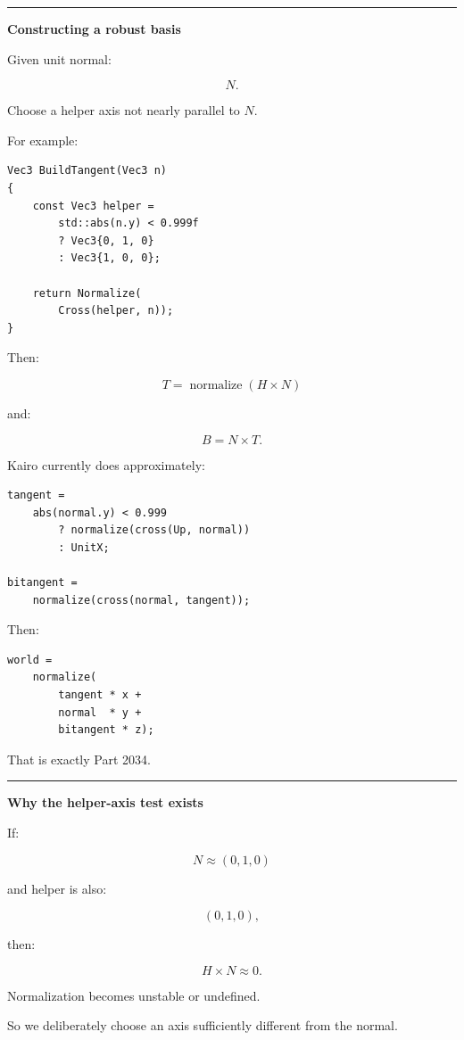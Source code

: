 \begin{center}\rule{0.5\linewidth}{0.5pt}\end{center}

\textbf{Constructing a robust basis}

Given unit normal:

\[
N.
\]

Choose a helper axis not nearly parallel to \(N\).

For example:

\begin{verbatim}
Vec3 BuildTangent(Vec3 n)
{
    const Vec3 helper =
        std::abs(n.y) < 0.999f
        ? Vec3{0, 1, 0}
        : Vec3{1, 0, 0};

    return Normalize(
        Cross(helper, n));
}
\end{verbatim}

Then:

\[
T=\operatorname{normalize}(H\times N)
\]

and:

\[
B=N\times T.
\]

Kairo currently does approximately:

\begin{verbatim}
tangent =
    abs(normal.y) < 0.999
        ? normalize(cross(Up, normal))
        : UnitX;

bitangent =
    normalize(cross(normal, tangent));
\end{verbatim}

Then:

\begin{verbatim}
world =
    normalize(
        tangent * x +
        normal  * y +
        bitangent * z);
\end{verbatim}

That is exactly Part 2034.

\begin{center}\rule{0.5\linewidth}{0.5pt}\end{center}

\textbf{Why the helper-axis test exists}

If:

\[
N\approx(0,1,0)
\]

and helper is also:

\[
(0,1,0),
\]

then:

\[
H\times N\approx0.
\]

Normalization becomes unstable or undefined.

So we deliberately choose an axis sufficiently different from the normal.

